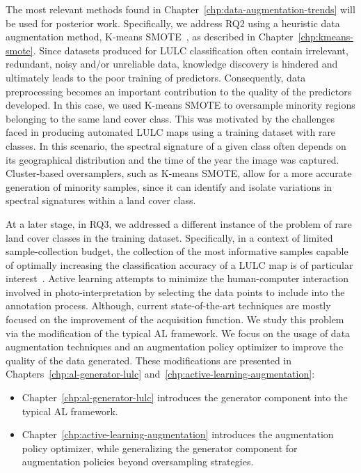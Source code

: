 The most relevant methods found in Chapter~\ref{chp:data-augmentation-trends}
will be used for posterior work. Specifically, we address RQ2 using a
heuristic data augmentation method, K-means SMOTE~\cite{Douzas2018}, as
described in Chapter~\ref{chp:kmeans-smote}. Since datasets produced for LULC
classification often contain irrelevant, redundant, noisy and/or unreliable
data, knowledge discovery is hindered and ultimately leads to the poor
training of predictors. Consequently, data preprocessing becomes an important
contribution to the quality of the predictors developed. In this case, we used
K-means SMOTE to oversample minority regions belonging to the same land cover
class. This was motivated by the challenges faced in producing automated LULC
maps using a training dataset with rare classes. In this scenario, the
spectral signature of a given class often depends on its geographical
distribution and the time of the year the image was captured. Cluster-based
oversamplers, such as K-means SMOTE, allow for a more accurate generation of
minority samples, since it can identify and isolate variations in spectral
signatures within a land cover class.

At a later stage, in RQ3, we addressed a different instance of the problem of
rare land cover classes in the training dataset. Specifically, in a context of
limited sample-collection budget, the collection of the most informative
samples capable of optimally increasing the classification accuracy of a LULC
map is of particular interest~\cite{Su2020}. Active learning attempts to
minimize the human-computer interaction involved in photo-interpretation by
selecting the data points to include into the annotation process. Although,
current state-of-the-art techniques are mostly focused on the improvement of
the acquisition function. We study this problem via the modification of the
typical AL framework. We focus on the usage of data augmentation techniques
and an augmentation policy optimizer to improve the quality of the data
generated. These modifications are presented in
Chapters~\ref{chp:al-generator-lulc}
and~\ref{chp:active-learning-augmentation}:

\begin{itemize}
    \item Chapter~\ref{chp:al-generator-lulc} introduces the generator
        component into the typical AL framework.
    \item Chapter~\ref{chp:active-learning-augmentation} introduces the
        augmentation policy optimizer, while generalizing the generator
        component for augmentation policies beyond oversampling strategies.
\end{itemize}

